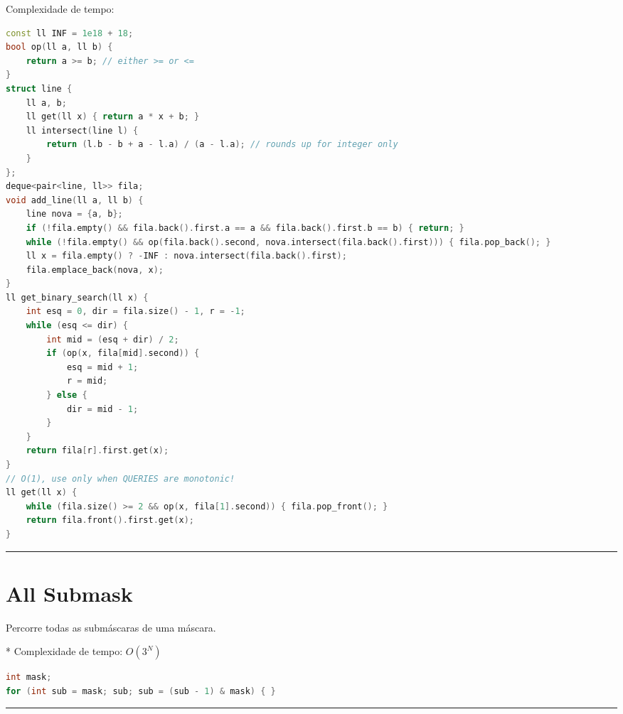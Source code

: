 \documentclass[11pt, a4paper, twoside]{book}
\begin{document}
Complexidade de tempo:




\hfill

\begin{lstlisting}[language=C++]
const ll INF = 1e18 + 18;
bool op(ll a, ll b) {
    return a >= b; // either >= or <=
}
struct line {
    ll a, b;
    ll get(ll x) { return a * x + b; }
    ll intersect(line l) {
        return (l.b - b + a - l.a) / (a - l.a); // rounds up for integer only
    }
};
deque<pair<line, ll>> fila;
void add_line(ll a, ll b) {
    line nova = {a, b};
    if (!fila.empty() && fila.back().first.a == a && fila.back().first.b == b) { return; }
    while (!fila.empty() && op(fila.back().second, nova.intersect(fila.back().first))) { fila.pop_back(); }
    ll x = fila.empty() ? -INF : nova.intersect(fila.back().first);
    fila.emplace_back(nova, x);
}
ll get_binary_search(ll x) {
    int esq = 0, dir = fila.size() - 1, r = -1;
    while (esq <= dir) {
        int mid = (esq + dir) / 2;
        if (op(x, fila[mid].second)) {
            esq = mid + 1;
            r = mid;
        } else {
            dir = mid - 1;
        }
    }
    return fila[r].first.get(x);
}
// O(1), use only when QUERIES are monotonic!
ll get(ll x) {
    while (fila.size() >= 2 && op(x, fila[1].second)) { fila.pop_front(); }
    return fila.front().first.get(x);
}
\end{lstlisting}

\hfill

\rule{\textwidth}{0.4pt}

\section{All Submask}



Percorre todas as submáscaras de uma máscara.



* Complexidade de tempo: $O(3^N)$


\hfill

\begin{multicols}{2}
\begin{lstlisting}[language=C++]
int mask;
for (int sub = mask; sub; sub = (sub - 1) & mask) { }
\end{lstlisting}
\end{multicols}

\hfill

\rule{\textwidth}{0.4pt}

\newpage
\end{document}
